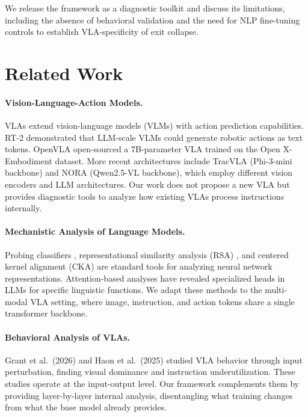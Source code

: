 \documentclass[letterpaper]{article}
\begin{document}
We release the framework as a diagnostic toolkit and discuss its limitations, including the absence of behavioral validation and the need for NLP fine-tuning controls to establish VLA-specificity of exit collapse.

\section{Related Work}

\paragraph{Vision-Language-Action Models.}
VLAs extend vision-language models (VLMs) with action prediction capabilities.
RT-2 \cite{brohan2023rt2} demonstrated that LLM-scale VLMs could generate robotic actions as text tokens.
OpenVLA \cite{kim2024openvla} open-sourced a 7B-parameter VLA trained on the Open X-Embodiment dataset.
More recent architectures include TracVLA (Phi-3-mini backbone) and NORA (Qwen2.5-VL backbone), which employ different vision encoders and LLM architectures.
Our work does not propose a new VLA but provides diagnostic tools to analyze how existing VLAs process instructions internally.

\paragraph{Mechanistic Analysis of Language Models.}
Probing classifiers \cite{belinkov2017neural,hewitt2019structural}, representational similarity analysis (RSA) \cite{kriegeskorte2008representational}, and centered kernel alignment (CKA) \cite{kornblith2019similarity} are standard tools for analyzing neural network representations.
Attention-based analyses have revealed specialized heads in LLMs for specific linguistic functions.
We adapt these methods to the multi-modal VLA setting, where image, instruction, and action tokens share a single transformer backbone.

\paragraph{Behavioral Analysis of VLAs.}
Grant et al.\ (2026) and Haon et al.\ (2025) studied VLA behavior through input perturbation, finding visual dominance and instruction underutilization.
These studies operate at the input-output level.
Our framework complements them by providing layer-by-layer internal analysis, disentangling what training changes from what the base model already provides.
\end{document}
